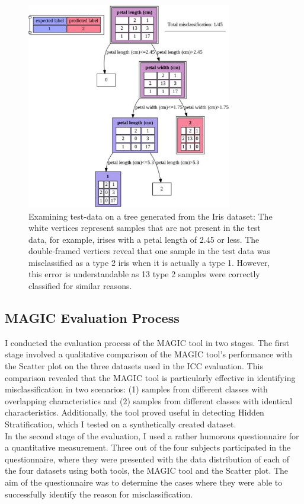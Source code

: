 \documentclass[11pt]{article}
\begin{document}
\begin{figure}[H]
\centering
\includegraphics[width=0.8\textwidth]{iris-magic.png}

\caption{Examining test-data on a tree generated from the Iris dataset: The white vertices represent samples that are not present in the test data, for example, irises with a petal length of 2.45 or less. The double-framed vertices reveal that one sample in the test data was misclassified as a type 2 iris when it is actually a type 1. However, this error is understandable as 13 type 2 samples were correctly classified for similar reasons.}
\label{fig:fig3}

\end{figure}

\subsection{MAGIC Evaluation Process}\label{MAGIC Evaluation Process}
I conducted the evaluation process of the MAGIC tool in two stages.
The first stage involved a qualitative comparison of the MAGIC tool's performance with the Scatter plot on the three datasets used in the ICC evaluation. This comparison revealed that the MAGIC tool is particularly effective in identifying misclassification in two scenarios: (1) samples from different classes with overlapping characteristics and (2) samples from different classes with identical characteristics. Additionally, the tool proved useful in detecting Hidden Stratification, which I tested on a synthetically created dataset.\\
In the second stage of the evaluation, I used a rather humorous questionnaire for a quantitative measurement. Three out of the four subjects participated in the questionnaire, where they were presented with the data distribution of each of the four datasets using both tools, the MAGIC tool and the Scatter plot. The aim of the questionnaire was to determine the cases where they were able to successfully identify the reason for misclassification.
\end{document}
